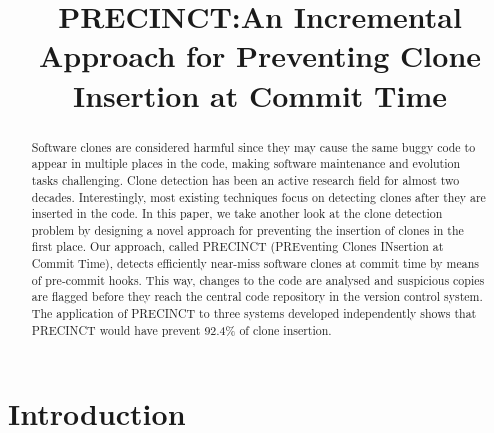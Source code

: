 \documentclass[conference]{IEEEtran}
\begin{document}
\title{PRECINCT:\@ An Incremental Approach for Preventing Clone Insertion at Commit Time}


\author{
\and
{}
}

\maketitle

\begin{abstract}
Software clones are considered harmful since they may cause the same buggy code to appear in multiple places in the code, making software maintenance and evolution tasks challenging. Clone detection has been an active research field for almost two decades.
Interestingly, most existing techniques focus on detecting clones after they are inserted in the code.
In this paper, we take another look at the clone detection problem by designing a novel approach for preventing the insertion of clones in the first place. Our approach, called PRECINCT (PREventing Clones INsertion at Commit Time),  detects efficiently  near-miss software clones at commit time by means of pre-commit hooks.
This way, changes to the code are analysed and suspicious copies are flagged before they reach the central code repository in the version control system.  The application of PRECINCT to three systems developed independently shows that PRECINCT would have prevent 92.4\% of clone insertion.



\end{abstract}


\IEEEpeerreviewmaketitle

\section{Introduction}
\label{sec:Introduction}
\end{document}
